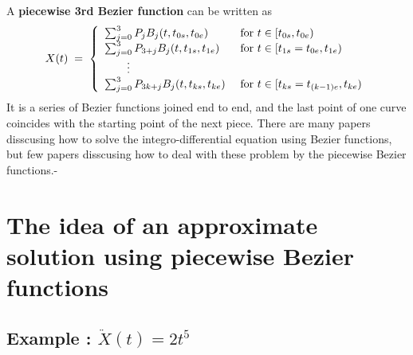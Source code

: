 \documentclass[12pt]{article}
\begin{document}
A \textbf{piecewise 3rd Bezier function} can be written as
%
\begin{align*}
	X(t) \;=\; \left\{ \begin{array}{l l}
		\sum_{j=0}^3 P_j B_j(t,t_{0s},t_{0e}) & \textrm{ for } t\in [t_{0s},t_{0e}) \\
		\sum_{j=0}^3 P_{3+j} B_j(t,t_{1s},t_{1e}) & \textrm{ for } t\in [t_{1s}=t_{0e},t_{1e}) \\
		\qquad \vdots \\
		\sum_{j=0}^3 P_{3k+j} B_j(t,t_{ks},t_{ke}) & \textrm{ for } t\in [t_{ks}=t_{(k-1)e},t_{ke})
	\end{array} \right. 
\end{align*}
%
It is a series of Bezier functions joined end to end, and the last point of one curve coincides with the starting point of the next piece.
There are many papers disscusing how to solve the integro-differential equation using Bezier functions, but few papers disscusing how to deal with these problem by the piecewise Bezier functions.\cite{Lewis:2023}-\cite{Razvarz:2018}





\section{The idea of an approximate solution using piecewise Bezier functions}





\subsection{Example : $\ddot{X}(t) = 2 t^5$}
\end{document}
